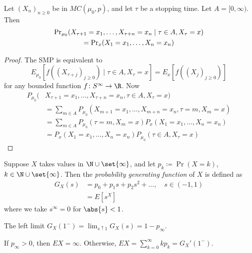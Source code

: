 \begin{theorem} \label{thm:strong_markov}
    Let $(X_n)_{n \ge 0}$ be in $MC(\mu_0, p)$, and let $\tau$ be a stopping
    time.
    Let $A = [0, \infty)$.
    Then \begin{multline*}
        \Pr\nolimits_{\mu_0}(X_{\tau+1} = x_1, \dots, X_{\tau+n} = x_n
            \mid \tau \in A, X_\tau = x) \\
        = \Pr\nolimits_x(X_1 = x_1, \dots, X_n = x_n)
    \end{multline*}
\end{theorem}
\begin{proof}
    The SMP is equivalent to \begin{equation*}
        E_{\mu_0}[f((X_{\tau+j})_{j \ge 0}) \mid \tau \in A, X_\tau = x]
            = E_x\left[f\left((X_j)_{j \ge 0}\right)\right]
    \end{equation*} for any bounded function $f \colon S^\infty \to \R$.
    Now \begin{align*}
        P_{\mu_0}(&X_{\tau+1} = x_1, \dots, X_{\tau+n} = x_n, \tau \in A,
        X_\tau = x) \\
            &= \sum_{m \in A} P_{\mu_0}(X_{m+1} = x_1, \dots, X_{m+n} = x_n,
                \tau = m, X_m = x) \\
            &= \sum_{m \in A} P_{\mu_0}(\tau = m, X_m = x)
                P_x(X_1 = x_1, \dots, X_n = x_n) \\
            &= P_x(X_1 = x_1, \dots, X_n = x_n)
                P_{\mu_0}(\tau \in A, X_\tau = x)
    \end{align*}
\end{proof}

\begin{definition}
    Suppose $X$ takes values in $\N \cup \set{\infty}$, and let
    $p_k \coloneq \Pr(X = k)$, $k \in \N \cup \set{\infty}$.
    Then the \emph{probability generating function} of $X$ is defined as \begin{align*}
        G_X(s) &= p_0 + p_1 s + p_2 s^2 + \dots, \quad s \in (-1, 1) \\
            &= E[s^X]
    \end{align*} where we take $s^\infty = 0$ for $\abs{s} < 1$.
\end{definition}
\begin{remark}
    The left limit $G_X(1^-) = \lim_{s \uparrow 1} G_X(s) = 1 - p_\infty$.
\end{remark}
If $p_\infty > 0$, then $EX = \infty$.
Otherwise, $EX = \sum_{k=0}^{\infty} k p_k = G_X'(1^-)$.

